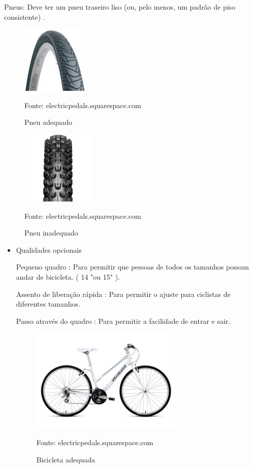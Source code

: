 \begin{itemize}
\begin{itemize}
	Pneus: Deve ter um pneu traseiro liso (ou, pelo menos, um padrão de piso consistente) . 
	
	\begin{figure}[H]
	 \centering
	\label{Pneu adequado}
	 \includegraphics[keepaspectratio=true,scale=0.8]{interacao/14.png}
	 \caption{Pneu adequado}
	 \small{Fonte: electricpedals.squarespace.com}
	\end{figure}
	
	\begin{figure}[H]
	 \centering
	\label{Pneu inadequado}
	 \includegraphics[keepaspectratio=true,scale=0.8]{interacao/15.png}
	 \caption{Pneu inadequado}
	 \small{Fonte: electricpedals.squarespace.com}
	\end{figure}
	
	\end{itemize}
	
	\begin{itemize}
	\item Qualidades opcionais
	
	Pequeno quadro : Para permitir que pessoas de todos os tamanhos possam andar de bicicleta. ( 14 "ou 15" ).

	Assento de liberação rápida : Para permitir o ajuste para ciclistas de diferentes tamanhos.
	
	Passo através do quadro : Para permitir a facilidade de entrar e sair. 
	
	\begin{figure}[H]
	 \centering
	\label{Bicicleta adequada}
	 \includegraphics[keepaspectratio=true,scale=0.8]{interacao/16.png}
	 \caption{Bicicleta adequada}
	 \small{Fonte: electricpedals.squarespace.com}
	\end{figure}
		
	\end{itemize}
\end{itemize}

